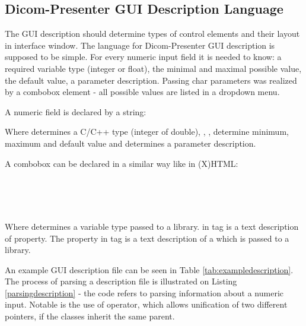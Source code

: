 \subsection{Dicom-Presenter GUI Description Language}

The GUI description should determine types of control elements and their layout in interface window. The language for Dicom-Presenter GUI description is supposed to be simple. For every numeric input field it is needed to know: a required variable type (integer or float), the minimal and maximal possible value, the default value, a parameter description. Passing char parameters was realized by a combobox element - all possible values are listed in a dropdown menu.

A numeric field is declared by a string:


Where  determines a C/C++ type (integer of double), , ,  determine minimum, maximum and default value and  determines a parameter description.

A combobox can be declared in a similar way like in (X)HTML:

\noindent \indent {}\\
\indent \indent {}\\
\indent \indent {}\\
\indent {}

Where  determines a variable type passed to a library.  in  tag is a text description of property. The  property in  tag is a text description of a  which is passed to a library.

An example GUI description file can be seen in Table \ref{tab:exampledescription}. The process of parsing a description file is illustrated on Listing \ref{parsingdescription} - the code refers to parsing information about a numeric input. Notable is the use of  operator, which allows unification of two different pointers, if the classes inherit the same parent.

\lstset{numbers=none,frame=none}

